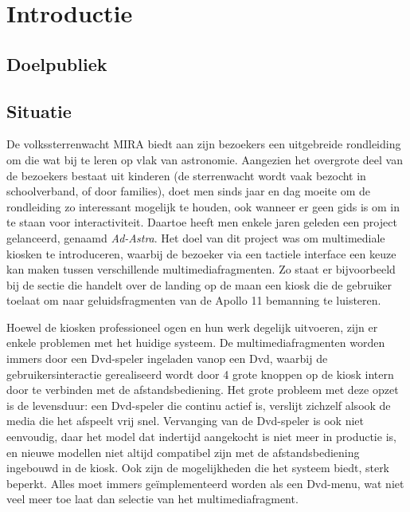 \part{Introductie}
\label{part:introductie}


%
%

\chapter{Doelpubliek}
\label{chap:doelpubliek}


%
%

\chapter{Situatie}
\label{chap:situatie}

De volkssterrenwacht MIRA biedt aan zijn bezoekers een uitgebreide rondleiding om die wat bij te leren op vlak van astronomie. Aangezien het overgrote deel van de bezoekers bestaat uit kinderen (de sterrenwacht wordt vaak bezocht in schoolverband, of door families), doet men sinds jaar en dag moeite om de rondleiding zo interessant mogelijk te houden, ook wanneer er geen gids is om in te staan voor interactiviteit. Daartoe heeft men enkele jaren geleden een project gelanceerd, genaamd \emph{Ad-Astra}. Het doel van dit project was om multimediale kiosken te introduceren, waarbij de bezoeker via een tactiele interface een keuze kan maken tussen verschillende multimediafragmenten. Zo staat er bijvoorbeeld bij de sectie die handelt over de landing op de maan een kiosk die de gebruiker toelaat om naar geluidsfragmenten van de Apollo 11 bemanning te luisteren.

Hoewel de kiosken professioneel ogen en hun werk degelijk uitvoeren, zijn er enkele problemen met het huidige systeem. De multimediafragmenten worden immers door een Dvd-speler ingeladen vanop een Dvd, waarbij de gebruikersinteractie gerealiseerd wordt door 4 grote knoppen op de kiosk intern door te verbinden met de afstandsbediening.
Het grote probleem met deze opzet is de levensduur: een Dvd-speler die continu actief is, verslijt zichzelf alsook de media die het afspeelt vrij snel. Vervanging van de Dvd-speler is ook niet eenvoudig, daar het model dat indertijd aangekocht is niet meer in productie is, en nieuwe modellen niet altijd compatibel zijn met de afstandsbediening ingebouwd in de kiosk.
Ook zijn de mogelijkheden die het systeem biedt, sterk beperkt. Alles moet immers geïmplementeerd worden als een Dvd-menu, wat niet veel meer toe laat dan selectie van het multimediafragment.

